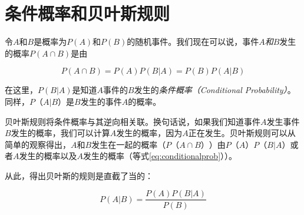 
\section{条件概率和贝叶斯规则}
\label{sec:bayesrule}
令$A$和$B$是概率为$P(A)$和$P(B)$的随机事件。我们现在可以说，事件$A$\emph{和}$B$发生的概率$P(A\cap B)$是由

\begin{equation}\label{eq:conditionalprob}
P(A \cap B)=P(A)P(B|A)=P(B)P(A|B)
\end{equation}



在这里，$P(B|A)$是知道$A$事件的$B$发生的\emph{条件概率（Conditional Probability）}。同样，$P（A|B）$是$B$发生的事件$A$的概率。

贝叶斯规则将条件概率与其逆向相关联。换句话说，如果我们知道事件$A$发生事件$B$发生的概率，我们可以计算$A$发生的概率，因为$A$正在发生。贝叶斯规则可以从简单的观察得出，$A$和$B$发生在一起的概率（$P（A\cap B）$）由$P（A）P（B|A）$或者$A$发生的概率以及$A$发生的概率（等式\ref{eq:conditionalprob}））。

从此，得出贝叶斯的规则是直截了当的：

\begin{equation}
P(A|B)=\frac{P(A)P(B|A)}{P(B)}
\end{equation}

